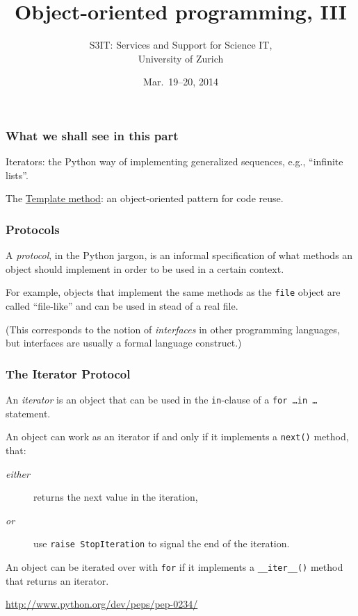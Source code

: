 \documentclass[english,serif,mathserif,xcolor=pdftex,dvipsnames,table]{beamer}
\title[OOP 3]{%
  Object-oriented programming, III
}
\author[S3IT]{%
  S3IT: Services and Support for Science IT, \\
  University of Zurich
}
\date{Mar.~19--20, 2014}
\begin{document}
\maketitle


\begin{frame}
  \frametitle{What we shall see in this part}

  Iterators: the Python way of implementing generalized sequences,
  e.g., ``infinite lists''.

  \+
  The \href{http://en.wikipedia.org/wiki/Template_method_pattern}{Template
    method}: an object-oriented pattern for code reuse.
\end{frame}


\begin{frame}
  \frametitle{Protocols}
  A \emph{protocol}, in the Python jargon, is an informal
  specification of what methods an object should implement in order to
  be used in a certain context.

  \+ For example, objects that implement the same methods as the
  \texttt{file} object are called ``file-like'' and can be used in
  stead of a real file.

  \+
  (This corresponds to the notion of \emph{interfaces} in other
  programming languages, but interfaces are usually a formal language
  construct.)
\end{frame}


\begin{frame}[fragile]
  \frametitle{The Iterator Protocol}

  An \emph{iterator} is an object that can be used in the
  \texttt{in}-clause of a \texttt{for \ldots in \ldots} statement.

  \+
  An object can work as an iterator if and only if it implements a
  \texttt{next()} method, that:
  \begin{description}
  \item[\emph{either}] returns the next value in the iteration,
  \item[\emph{or}] use \lstinline|raise StopIteration| to signal the
    end of the iteration.
  \end{description}

  \+
  An object can be iterated over with \lstinline|for| if it implements a
  \lstinline|__iter__()| method that returns an iterator.

  \begin{references}
    \url{http://www.python.org/dev/peps/pep-0234/}
  \end{references}
\end{frame}
\end{document}
